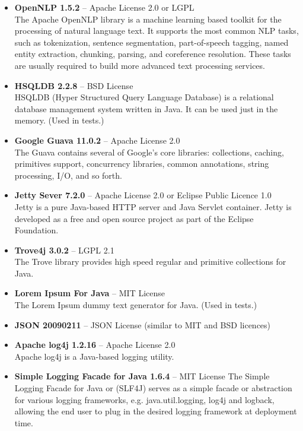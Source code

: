 \begin{itemize}
\item {\bf OpenNLP 1.5.2} -- Apache License 2.0 or LGPL \\
The Apache OpenNLP library is a machine learning based toolkit for the processing of natural language text. It supports the most common NLP tasks, such as tokenization, sentence segmentation, part-of-speech tagging, named entity extraction, chunking, parsing, and coreference resolution. These tasks are usually required to build more advanced text processing services.

\item {\bf HSQLDB 2.2.8} -- BSD License \\
HSQLDB (Hyper Structured Query Language Database) is a relational database management system written in Java. It can be used just in the memory. (Used in tests.)

\item {\bf Google Guava 11.0.2} -- Apache License 2.0 \\
The Guava contains several of Google's core libraries: collections, caching, primitives support, concurrency libraries, common annotations, string processing, I/O, and so forth.

\item {\bf Jetty Sever 7.2.0} -- Apache License 2.0 or Eclipse Public Licence 1.0 \\
Jetty is a pure Java-based HTTP server and Java Servlet container. Jetty is developed as a free and open source project as part of the Eclipse Foundation.

\item {\bf Trove4j 3.0.2} -- LGPL 2.1 \\
The Trove library provides high speed regular and primitive collections for Java. 

\item {\bf Lorem Ipsum For Java} -- MIT License \\
The Lorem Ipsum dummy text generator for Java. (Used in tests.)

\item {\bf JSON 20090211} -- JSON License (similar to MIT and BSD licences)

\item {\bf Apache log4j 1.2.16}  -- Apache License 2.0 \\
Apache log4j is a Java-based logging utility.

\item {\bf Simple Logging Facade for Java 1.6.4} -- MIT License
The Simple Logging Facade for Java or (SLF4J) serves as a simple facade or abstraction for various logging frameworks, e.g. java.util.logging, log4j and logback, allowing the end user to plug in the desired logging framework at deployment time.


\end{itemize}
